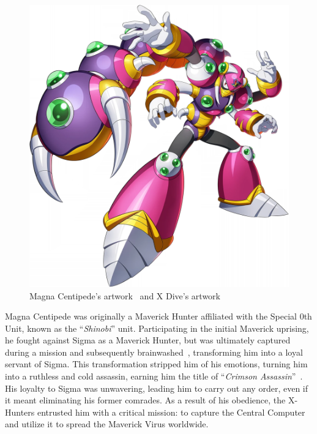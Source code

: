 \begin{figure}[htp]
	\includegraphics[height=\portraitsize]{figures/X2/Magna_centipede/XMagna_Centipede.png}
	\caption{Magna Centipede's artwork~\cite{book:MMX_Complete_art} and X Dive's artwork}
\end{figure}
Magna Centipede was originally a Maverick Hunter affiliated with the Special 0th Unit, known as the ``\textit{Shinobi}'' unit. Participating in the initial Maverick uprising, he fought against Sigma as a Maverick Hunter, but was ultimately captured during a mission and subsequently brainwashed~\cite{wayback:X2_resources}, transforming him into a loyal servant of Sigma. This transformation stripped him of his emotions, turning him into a ruthless and cold assassin, earning him the title of ``\textit{Crimson Assassin}''~\cite{book:MMX_Complete_art}. His loyalty to Sigma was unwavering, leading him to carry out any order, even if it meant eliminating his former comrades. As a result of his obedience, the X-Hunters entrusted him with a critical mission: to capture the Central Computer and utilize it to spread the Maverick Virus worldwide. 
